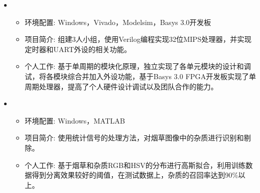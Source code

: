 \begin{itemize}[leftmargin=*]
    \item {}
    {\small
    \begin{itemize}
      \item 环境配置: Windows，Vivado，Modelsim，Basys 3.0开发板
      \item 项目简介: 组建3人小组，使用Verilog编程实现32位MIPS处理器，并实现定时器和UART外设的相关功能。
      \item 个人工作: 基于单周期的模块化原理，独立实现了各单元模块的设计和调试，将各模块综合并加入外设功能，基于Basys 3.0 FPGA开发板实现了单周期处理器，提高了个人硬件设计调试以及团队合作的能力。
    \end{itemize}
    }
    \item
    {\small
    \begin{itemize}
      \item 环境配置: Windows，MATLAB
      \item 项目简介: 使用统计信号的处理方法，对烟草图像中的杂质进行识别和剔除。
      \item 个人工作: 基于烟草和杂质RGB和HSV的分布进行高斯拟合，利用训练数据得到分离效果较好的阈值，在测试数据上，杂质的召回率达到90\%以上。
    \end{itemize}
    }

  \end{itemize}